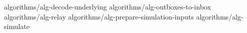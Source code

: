 %
%
%
%
{algorithms/alg-decode-underlying}
{algorithms/alg-outboxes-to-inbox}
{algorithms/alg-relay}
{algorithms/alg-prepare-simulation-inputs}
{algorithms/alg-simulate}
